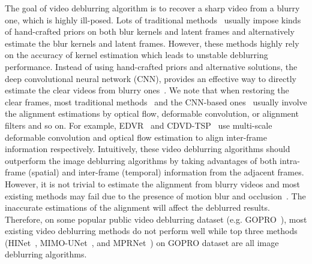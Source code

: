 \documentclass[letterpaper]{article} \usepackage{aaai22}  \usepackage{times}  \usepackage{helvet}  \usepackage{courier}  \usepackage[hyphens]{url}  \usepackage{graphicx} \urlstyle{rm} \def\UrlFont{\rm}  \usepackage{natbib}  \usepackage{caption} \DeclareCaptionStyle{ruled}{labelfont=normalfont,labelsep=colon,strut=off} \frenchspacing  \setlength{\pdfpagewidth}{8.5in}  \setlength{\pdfpageheight}{11in}  \newcommand{\hang}{\textcolor[rgb]{0.98,0.5,0.04}}
\begin{document}
The goal of video deblurring algorithm is to recover a sharp video from a blurry one, which is highly ill-posed.
Lots of traditional methods~\cite{4409009, 6909750, 7299181, 2014Modeling} usually impose kinds of hand-crafted priors on both blur kernels and latent frames and alternatively estimate the blur kernels and latent frames.
However, these methods highly rely on the accuracy of kernel estimation which leads to unstable deblurring performance.
Instead of using hand-crafted priors and alternative solutions, the deep convolutional neural network (CNN), 
provides an effective way to directly estimate the clear videos from blurry ones~\cite{2018Adversarial,zhou2019davanet, Gast_2019_corr, 2018Spatio,nah2019recurrent, 2019EDVR, Pan_2020_CVPR, Kim_2017_ICCV, ESTRNN, suin2021gated}. 
We note that when restoring the clear frames, most traditional methods~\cite{Motion2008, 6909750, 7299181} and the CNN-based ones~\cite{2018Spatio, Kim_2017_ICCV, 2019EDVR, Pan_2020_CVPR} usually involve the alignment estimations by optical flow, deformable convolution, or alignment filters and so on. 
For example, EDVR~\cite{2019EDVR} and CDVD-TSP~\cite{Pan_2020_CVPR} use multi-scale deformable convolution and optical flow estimation to align inter-frame information respectively.
Intuitively, these video deblurring algorithms should outperform the image deblurring algorithms by taking advantages of both intra-frame (spatial) and inter-frame (temporal) information from the adjacent frames.
However, it is not trivial to estimate the alignment from blurry videos and most existing methods may fail due to the presence of motion blur and occlusion~\cite{xue2019video}. The inaccurate estimations of the alignment will affect the deblurred results. 
Therefore, on some popular public video deblurring dataset (e.g. GOPRO~\cite{deepdeblur}),
most existing video deblurring methods do not perform well while top three methods ({HINet~\cite{Chen_2021_CVPR}}, {MIMO-UNet~\cite{MIMOUNet}}, and {MPRNet~\cite{Zamir2021MPRNet}}) on GOPRO dataset are all image deblurring algorithms.
\end{document}
